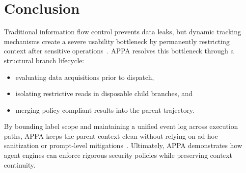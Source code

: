 \section{Conclusion}\label{sec:conclusion}

Traditional information flow control prevents data leaks, but dynamic tracking mechanisms create a severe usability bottleneck by permanently restricting context after sensitive operations~\cite{fides}. APPA resolves this bottleneck through a structural branch lifecycle:
\begin{itemize}
  \item evaluating data acquisitions prior to dispatch,
  \item isolating restrictive reads in disposable child branches, and
  \item merging policy-compliant results into the parent trajectory.
\end{itemize}
By bounding label scope and maintaining a unified event log across execution paths, APPA keeps the parent context clean without relying on ad-hoc sanitization or prompt-level mitigations~\cite{camel2025,willison2023dual}. Ultimately, APPA demonstrates how agent engines can enforce rigorous security policies while preserving context continuity.


